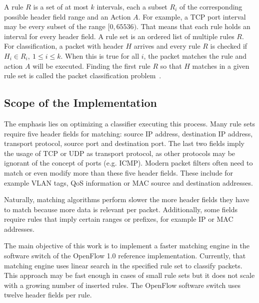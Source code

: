 \documentclass[conference]{IEEEtran}
\begin{document}
A rule $R$ is a set of at most $k$ intervals, each a subset $R_i$ of the 
corresponding possible header field range and an Action $A$.
For example, a TCP port interval may be every subset of the range $[0, 65536)$.
That means that each rule holds an interval for every header field.
A rule set is an ordered list of multiple rules $R$.
For classification, a packet with header $H$ arrives and every rule $R$ is checked if
$H_i \in R_i,\ 1 \leq i \leq k$.
When this is true for all $i$, the packet matches the rule and action $A$ will be executed.
Finding the first rule $R$ so that $H$ matches in a given rule set is called 
the packet classification problem~\cite{taylor2005survey}.

\subsection{Scope of the Implementation}
The emphasis lies on optimizing a classifier executing this process.
Many rule sets require five header fields for matching: source 
IP address, destination IP address, transport protocol, source port and destination port.
The last two fields imply the usage of TCP or UDP as transport protocol, 
as other protocols may be ignorant of the concept of ports (e.g. ICMP).
Modern packet filters often need to match or even modify more than these five header fields.
These include for example VLAN tags, QoS information or MAC source and destination addresses.

Naturally, matching algorithms perform slower the more header fields they 
have to match because more data is relevant per packet.
Additionally, some fields require rules that imply certain ranges or prefixes, for example IP or MAC addresses.

The main objective of this work is to implement a faster matching engine in the 
software switch of the OpenFlow 1.0 reference implementation.
Currently, that matching engine uses linear search in the specified rule set to classify packets.
This approach may be fast enough in cases of small rule sets but it does not scale
with a growing number of inserted rules.
The OpenFlow software switch uses twelve header fields per rule.
\end{document}
